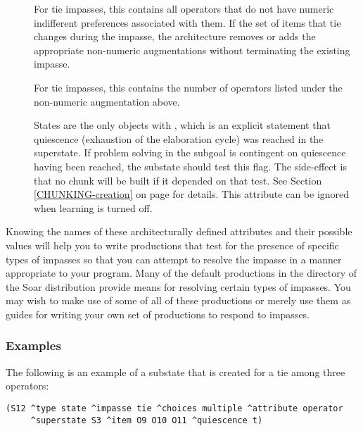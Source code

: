 \begin{description}
\item [] For tie impasses, this contains all operators that
        do not have numeric indifferent preferences associated with them. If the
        set of items that tie changes during the impasse, the architecture
        removes or adds the appropriate non-numeric augmentations without
        terminating the existing impasse. \vspace{-8pt}

\item [] For tie impasses, this contains the
        number of operators listed under the non-numeric augmentation above.\vspace{-8pt}

\item [] States are the only objects with 
, which is an explicit statement that quiescence (exhaustion of the
        elaboration cycle) was reached in the superstate.  If problem solving
        in the subgoal is contingent on quiescence having been reached, the
        substate should test this flag.  The side-effect is that no chunk will
        be built if it depended on that test. See Section
        \ref{CHUNKING-creation} on page \pageref{CHUNKING-creation} for
        details. This attribute can be ignored when learning is turned off.

\end{description} 

Knowing the names of these architecturally defined attributes and their
possible values will help you to write productions that test for the presence
of specific types of impasses so that you can attempt to resolve the impasse
in a manner appropriate to your program. Many of the default
productions in the  directory of the Soar distribution
 provide means for resolving
certain types of impasses. You may wish to make use of some of all of these
productions or merely use them as guides for writing your own set of
productions to respond to impasses.

\subsubsection*{Examples}

The following is an example of a substate that is created for a tie among
three operators:
\begin{verbatim}
(S12 ^type state ^impasse tie ^choices multiple ^attribute operator 
     ^superstate S3 ^item O9 O10 O11 ^quiescence t)
\end{verbatim} \vspace{12pt}

